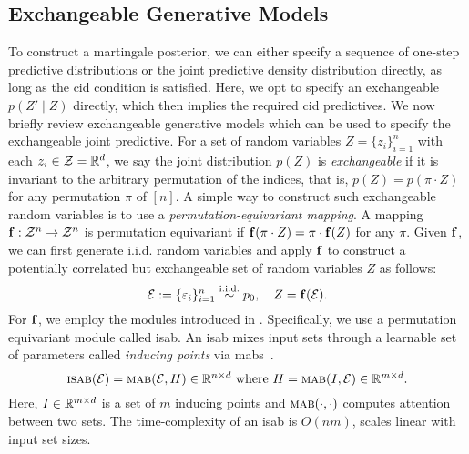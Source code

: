  

\subsection{Exchangeable Generative Models}\label{main:subsec:exchangeable}

To construct a martingale posterior, we can either specify a sequence of one-step predictive distributions or the joint predictive density distribution directly, as long as the \gls{cid} condition is satisfied.  Here, we opt to specify an exchangeable $p(Z' \mid Z)$ directly, which then implies the required \gls{cid} predictives. We now briefly review exchangeable generative models which can be used to specify the exchangeable joint predictive.  For a set of random variables $Z = \{z_i\}_{i=1}^n$ with each $z_i\in {\mathcal{Z}} = \mathbb{R}^{d}$, we say the joint distribution $p(Z)$ is \emph{exchangeable} if it is invariant to the arbitrary permutation of the indices, that is, $p(Z) = p(\pi\cdot Z)$ for any permutation $\pi$ of $[n]$. A simple way to construct such exchangeable random variables is to use a \emph{permutation-equivariant mapping}. A mapping $\mathbf{f}: {\mathcal{Z}}^n\to{\mathcal{Z}}^n$ is permutation equivariant if $\mathbf{f}(\pi\cdot Z) = \pi\cdot\mathbf{f}(Z)$ for any $\pi$. Given $\mathbf{f}$, we can first generate i.i.d. random variables and apply $\mathbf{f}$ to construct a potentially correlated but exchangeable set of random variables $Z$ as follows:
\[
{\mathcal{E}} := \{\varepsilon_i\}_{i=1}^n \overset{\mathrm{i.i.d.}}{\sim} p_0, \quad Z = \mathbf{f}({\mathcal{E}}).
\]
For $\mathbf{f}$, we employ the modules introduced in \citet{lee2019set}. Specifically, we use a permutation equivariant module called  \gls{isab}. An \gls{isab} mixes input sets through a learnable set of parameters called \emph{inducing points} via \glspl{mab}~\citep{vaswani2017attention,lee2019set}. 
\[
\textsc{isab}({\mathcal{E}}) = \textsc{mab}({\mathcal{E}}, H) \in \mathbb{R}^{n\times d}\text{ where } H = \textsc{mab}(I, {\mathcal{E}})\in \mathbb{R}^{m\times d}.
\]
Here, $I \in \mathbb{R}^{m\times d}$ is a set of $m$ inducing points and $\textsc{mab}(\cdot,\cdot)$ computes attention between two sets.
The time-complexity of an \gls{isab} is $O(nm)$, scales linear with input set sizes.


